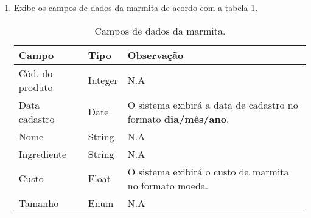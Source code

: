 \begin{enumerate}[label=ED\arabic*]
	\item Exibe os campos de dados da marmita de acordo com a tabela \ref{uc017_tb_rn1}. \label{uc017_rn:1}
	\begin{table}[htb]
		\ABNTEXfontereduzida
		\caption[Campos de dados da marmita]{Campos de dados da marmita.}
		\label{uc017_tb_rn1}
		\begin{tabular}{|p{4.0cm}|p{3.0cm}|p{7.25cm}|}
			\hline
			\textbf{Campo}  & \textbf{Tipo} & \textbf{Observação}                                                   \\ \hline
			Cód. do produto & Integer       & N.A                                                                   \\ \hline
			Data cadastro   & Date          & O sistema exibirá a data de cadastro no formato \textbf{dia/mês/ano}. \\ \hline
			Nome            & String        & N.A                                                                   \\ \hline
			Ingrediente     & String        & N.A                                                                   \\ \hline
			Custo           & Float         & O sistema exibirá o custo da marmita no formato moeda.                \\ \hline
			Tamanho         & Enum          & N.A                                                                   \\ \hline
		\end{tabular}
	\end{table}
\end{enumerate}